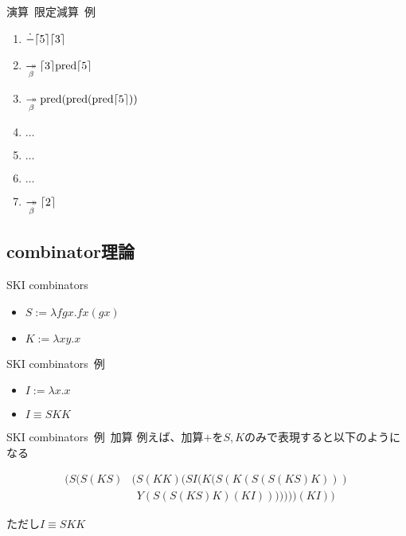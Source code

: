 \documentclass[pdflatex,17pt]{beamer}
\begin{document}
\begin{frame}{演算~限定減算~例}
    \begin{enumerate}
        \item $\dot{-}\lceil 5 \rceil\lceil 3 \rceil$
        \pause
        \item $\underset{\beta}{\twoheadrightarrow} \lceil 3 \rceil{\rm pred}\lceil 5 \rceil$
        \pause
        \item $\underset{\beta}{\twoheadrightarrow} {\rm pred}({\rm pred}({\rm pred}\lceil 5 \rceil))$
        \pause
        \item $\dots$
        \pause
        \item $\dots$
        \pause
        \item $\dots$
        \pause
        \item $\underset{\beta}{\twoheadrightarrow} \lceil 2 \rceil$
    \end{enumerate}
\end{frame}

\subsection{combinator理論}
\begin{frame}{SKI combinators}
    \begin{itemize}
        \item $S := \lambda f g x. f x (g x)$
        \item $K := \lambda x y. x$
    \end{itemize}
\end{frame}

\begin{frame}{SKI combinators~例}
    \begin{itemize}
        \item $I := \lambda x. x$
        \item $I \equiv SKK$
    \end{itemize}
\end{frame}

\begin{frame}{SKI combinators~例~加算}
    例えば、加算$+$を$S,K$のみで表現すると以下のようになる

    $$ \begin{array}{rl}
        (S (S (K S) & (S (K K) (S I (K (S (K (S (S (K S) K))) \\
                    & ~~ Y (S (S (K S) K) (K I))))))) (K I))
    \end{array} $$

    ただし$I \equiv SKK$
\end{frame}
\end{document}
